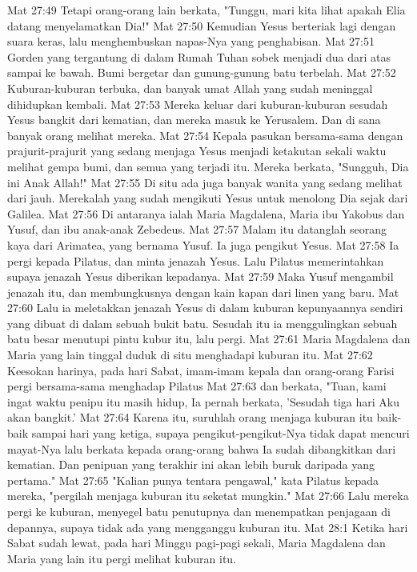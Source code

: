 Mat 27:49  Tetapi orang-orang lain berkata, "Tunggu, mari kita lihat apakah Elia datang menyelamatkan Dia!"
Mat 27:50  Kemudian Yesus berteriak lagi dengan suara keras, lalu menghembuskan napas-Nya yang penghabisan.
Mat 27:51  Gorden yang tergantung di dalam Rumah Tuhan sobek menjadi dua dari atas sampai ke bawah. Bumi bergetar dan gunung-gunung batu terbelah.
Mat 27:52  Kuburan-kuburan terbuka, dan banyak umat Allah yang sudah meninggal dihidupkan kembali.
Mat 27:53  Mereka keluar dari kuburan-kuburan sesudah Yesus bangkit dari kematian, dan mereka masuk ke Yerusalem. Dan di sana banyak orang melihat mereka.
Mat 27:54  Kepala pasukan bersama-sama dengan prajurit-prajurit yang sedang menjaga Yesus menjadi ketakutan sekali waktu melihat gempa bumi, dan semua yang terjadi itu. Mereka berkata, "Sungguh, Dia ini Anak Allah!"
Mat 27:55  Di situ ada juga banyak wanita yang sedang melihat dari jauh. Merekalah yang sudah mengikuti Yesus untuk menolong Dia sejak dari Galilea.
Mat 27:56  Di antaranya ialah Maria Magdalena, Maria ibu Yakobus dan Yusuf, dan ibu anak-anak Zebedeus.
Mat 27:57  Malam itu datanglah seorang kaya dari Arimatea, yang bernama Yusuf. Ia juga pengikut Yesus.
Mat 27:58  Ia pergi kepada Pilatus, dan minta jenazah Yesus. Lalu Pilatus memerintahkan supaya jenazah Yesus diberikan kepadanya.
Mat 27:59  Maka Yusuf mengambil jenazah itu, dan membungkusnya dengan kain kapan dari linen yang baru.
Mat 27:60  Lalu ia meletakkan jenazah Yesus di dalam kuburan kepunyaannya sendiri yang dibuat di dalam sebuah bukit batu. Sesudah itu ia menggulingkan sebuah batu besar menutupi pintu kubur itu, lalu pergi.
Mat 27:61  Maria Magdalena dan Maria yang lain tinggal duduk di situ menghadapi kuburan itu.
Mat 27:62  Keesokan harinya, pada hari Sabat, imam-imam kepala dan orang-orang Farisi pergi bersama-sama menghadap Pilatus
Mat 27:63  dan berkata, "Tuan, kami ingat waktu penipu itu masih hidup, Ia pernah berkata, 'Sesudah tiga hari Aku akan bangkit.'
Mat 27:64  Karena itu, suruhlah orang menjaga kuburan itu baik-baik sampai hari yang ketiga, supaya pengikut-pengikut-Nya tidak dapat mencuri mayat-Nya lalu berkata kepada orang-orang bahwa Ia sudah dibangkitkan dari kematian. Dan penipuan yang terakhir ini akan lebih buruk daripada yang pertama."
Mat 27:65  "Kalian punya tentara pengawal," kata Pilatus kepada mereka, "pergilah menjaga kuburan itu seketat mungkin."
Mat 27:66  Lalu mereka pergi ke kuburan, menyegel batu penutupnya dan menempatkan penjagaan di depannya, supaya tidak ada yang mengganggu kuburan itu.
Mat 28:1  Ketika hari Sabat sudah lewat, pada hari Minggu pagi-pagi sekali, Maria Magdalena dan Maria yang lain itu pergi melihat kuburan itu.
